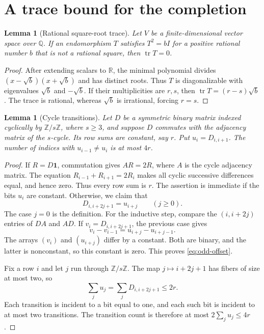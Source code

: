 \documentclass[11pt,reqno]{amsart}
\newtheorem{lemma}[theorem]{Lemma}
\theoremstyle{definition}
\theoremstyle{remark}
\numberwithin{equation}{section}
\DeclareMathOperator{\tr}{tr}
\newcommand{\one}{\mathbf 1}
\newcommand{\R}{\mathbb R}
\newcommand{\Q}{\mathbb Q}
\begin{document}
\section{A trace bound for the completion}

\begin{lemma}[Rational square-root trace]\label{lem:rational-trace}
Let $V$ be a finite-dimensional vector space over $\Q$. If an
endomorphism $T$ satisfies $T^2=bI$ for a positive rational number $b$
that is not a rational square, then $\tr T=0$.
\end{lemma}
\begin{proof}
After extending scalars to $\R$, the minimal polynomial divides
$(x-\sqrt b)(x+\sqrt b)$ and has distinct roots. Thus $T$ is
diagonalizable with eigenvalues $\sqrt b$ and $-\sqrt b$.
If their multiplicities are $r,s$, then
$\tr T=(r-s)\sqrt b$. The trace is rational, whereas $\sqrt b$ is
irrational, forcing $r=s$.
\end{proof}

\begin{lemma}[Cycle transitions]\label{lem:cycle}
Let $D$ be a symmetric binary matrix indexed cyclically by
$\mathbb Z/s\mathbb Z$, where $s\ge3$, and suppose $D$ commutes with
the adjacency matrix of the $s$-cycle. Its row sums are constant, say
$r$. Put $u_i=D_{i,i+1}$. The number of indices with $u_{i-1}\ne u_i$
is at most $4r$.
\end{lemma}
\begin{proof}
If $R=D\one$, commutation gives $AR=2R$, where $A$ is the cycle
adjacency matrix. The equation $R_{i-1}+R_{i+1}=2R_i$ makes all cyclic
successive differences equal, and hence zero. Thus every row sum is $r$.
The assertion is immediate if the bits $u_i$ are constant. Otherwise,
we claim that
\begin{equation}\label{eq:odd-offset}
 D_{i,i+2j+1}=u_{i+j}\qquad(j\ge0).
\end{equation}
The case $j=0$ is the definition. For the inductive step, compare the
$(i,i+2j)$ entries of $DA$ and $AD$. If
$v_i=D_{i,i+2j+1}$, the previous case gives
\[
 v_i-v_{i-1}=u_{i+j}-u_{i+j-1}.
\]
The arrays $(v_i)$ and $(u_{i+j})$ differ by a constant. Both are binary,
and the latter is nonconstant, so this constant is zero.
This proves \eqref{eq:odd-offset}.

Fix a row $i$ and let $j$ run through $\mathbb Z/s\mathbb Z$.
The map $j\mapsto i+2j+1$ has fibers of size at most two, so
\[
 \sum_j u_j=\sum_j D_{i,i+2j+1}\le2r.
\]
Each transition is incident to a bit equal to one, and each such bit is
incident to at most two transitions. The transition count is therefore
at most $2\sum_j u_j\le4r$.
\end{proof}
\end{document}
